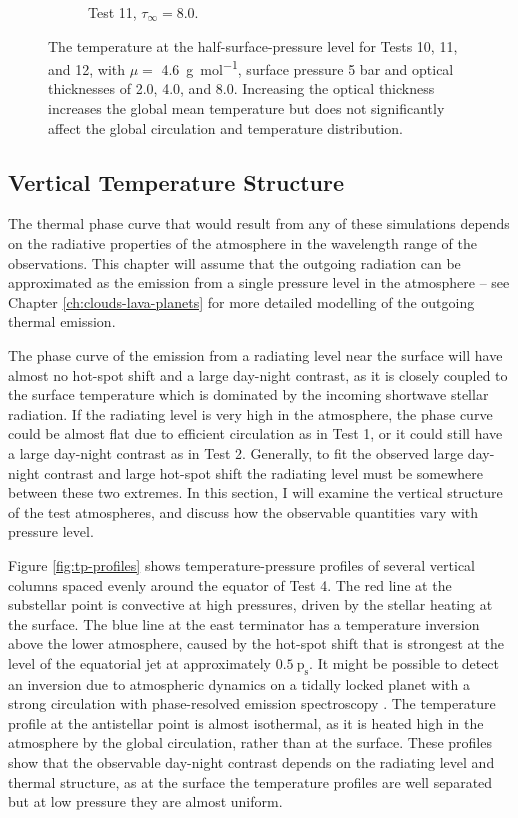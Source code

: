\begin{figure}
\begin{subfigure}[t]{0.32\textwidth}
    \caption{Test 11, $\tau_{\infty} = 8.0$.}
    \label{fig:free-h-shear}
  \end{subfigure}
  \caption{The temperature at the half-surface-pressure level for Tests 10, 11, and 12, with $\mu=$ \SI{4.6}{\gram\per\mole}, surface pressure 5 bar and optical thicknesses of 2.0, 4.0, and 8.0. Increasing the optical thickness increases the global mean temperature but does not significantly affect the global circulation and temperature distribution.}
\label{fig:vary_tau_maps}
\end{figure}

\subsection{Vertical Temperature Structure}\label{sec:vertical_structure}

The thermal phase curve that would result from any of these simulations depends on the radiative properties of the atmosphere in the wavelength range of the observations. This chapter will assume that the outgoing radiation can be approximated as the emission from a single pressure level in the atmosphere -- see Chapter \ref{ch:clouds-lava-planets} for more detailed modelling of the outgoing thermal emission.

The phase curve of the emission from a radiating level near the surface will have almost no hot-spot shift and a large day-night contrast, as it is closely coupled to the surface temperature which is dominated by the incoming shortwave stellar radiation. If the radiating level is very high in the atmosphere, the phase curve could be almost flat due to efficient circulation as in Test 1, or it could still have a large day-night contrast as in Test 2. Generally, to fit the observed large day-night contrast and large hot-spot shift the radiating level must be somewhere between these two extremes. In this section, I will examine the vertical structure of the test atmospheres, and discuss how the observable quantities vary with pressure level.

Figure \ref{fig:tp-profiles} shows temperature-pressure profiles of several vertical columns spaced evenly around the equator of Test 4. The red line at the substellar point is convective at high pressures, driven by the stellar heating at the surface. The blue line at the east terminator has a temperature inversion above the lower atmosphere, caused by the hot-spot shift that is strongest at the level of the equatorial jet at approximately $0.5\ \mathrm{p_{s}}$. It might be possible to detect an inversion due to atmospheric dynamics on a tidally locked planet with a strong circulation with phase-resolved emission spectroscopy \citep{stevenson2014thermal}. The temperature profile at the antistellar point is almost isothermal, as it is heated high in the atmosphere by the global circulation, rather than at the surface. These profiles show that the observable day-night contrast depends on the radiating level and thermal structure, as at the surface the temperature profiles are well separated but at low pressure they are almost uniform.

